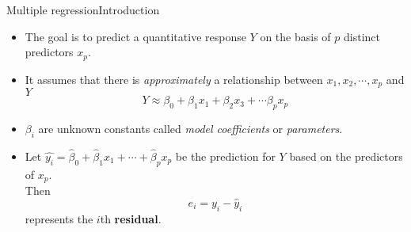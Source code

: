 \begin{frame}{Multiple regression}{Introduction}

\begin{itemize}
    \item The goal is to predict a quantitative response $Y$ on the basis of $p$ distinct predictors $x_p$. \pause

    \item It assumes that there is \textit{approximately} a relationship between $x_1, x_2, \cdots, x_p$ and $Y$ \pause
    $$ Y \approx \beta_0 + \beta_1 x_1 + \beta_2 x_3 + \cdots \beta_p x_p $$

    \item $\beta_i$ are unknown constants called \textit{model coeﬃcients} or \textit{parameters}. \pause

    \item Let $\hat{y_i} = \hat{\beta}_0 + \hat{\beta}_1 x_1 + \cdots + \hat{\beta}_p x_p $ be the prediction for $Y$ based on the predictors of $x_p$. \pause \\ Then 
    $$e_i = y_i - \hat{y}_i$$ \pause 
    represents the $i$th \textbf{residual}.
      
\end{itemize}
\end{frame}
